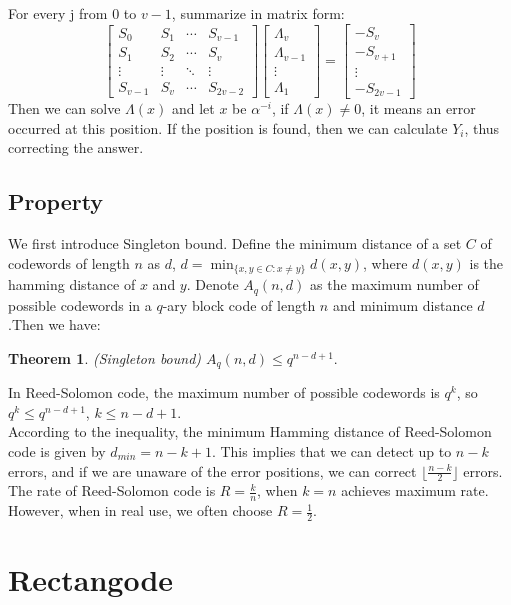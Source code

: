 \documentclass[12pt]{article}
\newtheorem{defn}{Theorem}[section]
\begin{document}
For every j from $0$ to $v-1$, summarize in matrix form:
\[ 		
\begin{bmatrix} 		
S_0 & S_1 & \cdots & S_{v-1} \\
S_1 & S_2 & \cdots & S_v \\
\vdots & \vdots & \ddots & \vdots \\
S_{v-1} & S_v & \cdots & S_{2v-2} 		
\end{bmatrix} 			
\begin{bmatrix} 		
\Lambda_v \\ 
\Lambda_{v-1} \\
\vdots \\
\Lambda_1 		
\end{bmatrix} 
=
\begin{bmatrix} 	
-S_v \\
-S_{v+1} \\
\vdots \\
-S_{2v-1} 		
\end{bmatrix} 	
\]
Then we can solve $\Lambda(x)$ and let $x$ be $\alpha^{-i}$, if $\Lambda(x) \neq 0$, it means an error occurred at this position. If the position is found, then we can calculate $Y_i$, thus correcting the answer.
\subsection{Property}
We first introduce Singleton bound. Define the minimum distance of a set $C$ of codewords of length $n$ as $d$, $\displaystyle d = \min_{\{x,y\in C:x\neq y\}} d(x,y)$, where $d(x,y)$ is the hamming distance of $x$ and $y$. Denote $A_{{q}}(n,d)$ as the maximum number of possible codewords in a $q$-ary block code of length $n$ and minimum distance $d$.Then we have:
\begin{defn}
(Singleton bound)  ${  A_{q}(n,d)\leq q^{n-d+1}.}$
\end{defn}
In Reed-Solomon code, the maximum number of possible codewords is $q^k$, so $q^k \leq q^{n-d+1}$, $k \leq n-d+1$.\\
According to the inequality, the minimum Hamming distance of Reed-Solomon code is given by $d_{min} = n - k + 1$. This implies that we can detect up to $n - k$ errors, and if we are unaware of the error positions, we can correct $\lfloor \frac{n-k}{2} \rfloor$ errors. \\
The rate of Reed-Solomon code is $R = \frac{k}{n}$, when $k = n$ achieves maximum rate. However, when in real use, we often choose $R = \frac{1}{2}$. 

\section{Rectangode}
\end{document}
